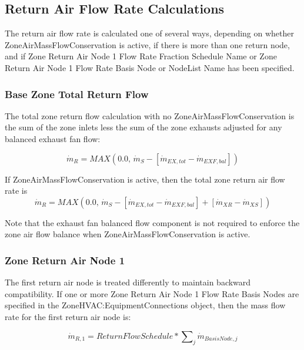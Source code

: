 \subsection{Return Air Flow Rate Calculations}\label{return-air-flow-rate-calculations}

The return air flow rate is calculated one of several ways, depending on whether ZoneAirMassFlowConservation is active, if there is more than one return node, and if Zone Return Air Node 1 Flow Rate Fraction Schedule Name or Zone Return Air Node 1 Flow Rate Basis Node or NodeList Name has been specified.


\subsubsection{Base Zone Total Return Flow}\label{base-zone-total-return-flow}

The total zone return flow calculation with no ZoneAirMassFlowConservation is the sum of the zone inlets less the sum of the zone exhausts adjusted for any balanced exhaust fan flow:

\begin{equation}
{\dot m_{R}} = MAX\left( {0.0,\,{{\dot m}_S} - [{{\dot m}_{EX,tot}} - {\dot m_{EXF,bal}}]} \right)
\end{equation}

If ZoneAirMassFlowConservation is active, then the total zone return air flow rate is 
\begin{equation}
{\dot m_{R}} = MAX\left( {0.0,\,{{\dot m}_S} - [{{\dot m}_{EX,tot}} - {\dot m_{EXF,bal}}] + [{{\dot m}_{XR}} - {{\dot m}_{XS}}]} \right)
\end{equation}

Note that the exhaust fan balanced flow component is not required to enforce the zone air flow balance when ZoneAirMassFlowConservation is active. 

\subsubsection{Zone Return Air Node 1}\label{zone-return-air-node1}

The first return air node is treated differently to maintain backward compatibility. If one or more Zone Return Air Node 1 Flow Rate Basis Nodes are specified in the ZoneHVAC:EquipmentConnections object, then the mass flow rate for the first return air node is:

\begin{equation}
{\dot m_{R,1}} = ReturnFlowSchedule*\sum\nolimits_j {{{\dot m}_{BasisNode,j}}}
\end{equation}

